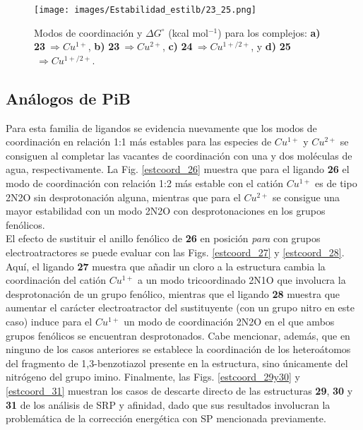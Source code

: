 \hspace{0cm}
\vfill
\begin{figure}[ht] 
\centering
\centerline{\texttt{[image: images/Estabilidad\_estilb/23\_25.png]}}
\caption{Modos de coordinación y $\Delta G^{\circ}$ (kcal mol$^{-1}$) para los complejos: \textbf{a)} \textbf{23}$\ \Rightarrow Cu^{1+}$, \textbf{b)} \textbf{23}$\ \Rightarrow Cu^{2+}$, \textbf{c)} \textbf{24}$\ \Rightarrow Cu^{1+/2+}$, y \textbf{d)} \textbf{25}$\ \Rightarrow Cu^{1+/2+}$.}
\label{estcoord_23_25}
\end{figure}
\vfill
\hspace{0cm}

\subsection{Análogos de PiB}

Para esta familia de ligandos se evidencia nuevamente que los modos de coordinación en relación 1:1 más estables para las especies de $Cu^{1+}$ y $Cu^{2+}$ se consiguen al completar las vacantes de coordinación con una y dos moléculas de agua, respectivamente. La Fig. \ref{estcoord_26} muestra que para el ligando \textbf{26} el modo de coordinación con relación 1:2 más estable con el catión $Cu^{1+}$ es de tipo 2N2O sin desprotonación alguna, mientras que para el $Cu^{2+}$ se consigue una mayor estabilidad con un modo 2N2O con desprotonaciones en los grupos fenólicos.\\

El efecto de sustituir el anillo fenólico de \textbf{26} en posición \textit{para} con grupos electroatractores se puede evaluar con las Figs. \ref{estcoord_27} y \ref{estcoord_28}. Aquí, el ligando \textbf{27} muestra que añadir un cloro a la estructura cambia la coordinación del catión $Cu^{1+}$ a un modo tricoordinado 2N1O que involucra la desprotonación de un grupo fenólico, mientras que el ligando \textbf{28} muestra que aumentar el carácter electroatractor del sustituyente (con un grupo nitro en este caso) induce para el $Cu^{1+}$ un modo de coordinación 2N2O en el que ambos grupos fenólicos se encuentran desprotonados. Cabe mencionar, además, que en ninguno de los casos anteriores se establece la coordinación de los heteroátomos del fragmento de 1,3-benzotiazol presente en la estructura, sino únicamente del nitrógeno del grupo imino. Finalmente, las Figs. \ref{estcoord_29y30} y \ref{estcoord_31} muestran los casos de descarte directo de las estructuras \textbf{29}, \textbf{30} y \textbf{31} de los análisis de SRP y afinidad, dado que sus resultados involucran la problemática de la corrección energética con SP mencionada previamente.


